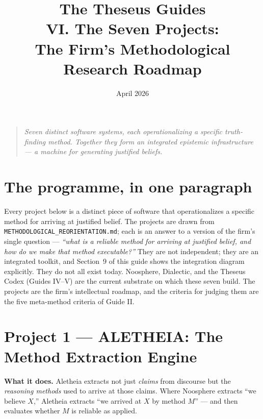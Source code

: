 \documentclass[11pt,letterpaper]{article}
\title{\textbf{The Theseus Guides}\\[6pt]\large VI. The Seven Projects:\\The Firm's Methodological Research Roadmap}
\date{April 2026}
\author{}
\newcommand{\file}[1]{\texttt{#1}}
\begin{document}
\maketitle
\thispagestyle{empty}

\begin{quote}\itshape
Seven distinct software systems, each operationalizing a specific truth-finding method. Together they form an integrated epistemic infrastructure --- a machine for generating justified beliefs.
\end{quote}

\vspace{1em}
\tableofcontents
\newpage

\section{The programme, in one paragraph}

Every project below is a distinct piece of software that operationalizes a specific method for arriving at justified belief. The projects are drawn from \file{METHODOLOGICAL\_REORIENTATION.md}; each is an answer to a version of the firm's single question --- \emph{``what is a reliable method for arriving at justified belief, and how do we make that method executable?''} They are not independent; they are an integrated toolkit, and Section~9 of this guide shows the integration diagram explicitly. They do not all exist today. Noosphere, Dialectic, and the Theseus Codex (Guides IV--V) are the current substrate on which these seven build. The projects are the firm's intellectual roadmap, and the criteria for judging them are the five meta-method criteria of Guide II.

\section{Project 1 --- ALETHEIA: The Method Extraction Engine}

\textbf{What it does.} Aletheia extracts not just \emph{claims} from discourse but the \emph{reasoning methods} used to arrive at those claims. Where Noosphere extracts ``we believe $X$,'' Aletheia extracts ``we arrived at $X$ by method $M$'' --- and then evaluates whether $M$ is reliable as applied.
\end{document}

